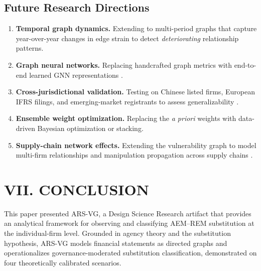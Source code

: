 \documentclass[12pt]{article}
\begin{document}
\subsection*{Future Research Directions}

\begin{enumerate}
    \item \textbf{Temporal graph dynamics.}  Extending to multi-period graphs
    that capture year-over-year changes in edge strain to detect
    \emph{deteriorating} relationship patterns.

    \item \textbf{Graph neural networks.}  Replacing handcrafted graph metrics
    with end-to-end learned GNN representations
    \citep{liu2020,wang2019}.

    \item \textbf{Cross-jurisdictional validation.}  Testing on Chinese listed
    firms, European IFRS filings, and emerging-market registrants to assess
    generalizability \citep{ho2015}.

    \item \textbf{Ensemble weight optimization.}  Replacing the \textit{a
    priori} weights with data-driven Bayesian optimization or stacking.

    \item \textbf{Supply-chain network effects.}  Extending the vulnerability
    graph to model multi-firm relationships and manipulation propagation across
    supply chains \citep{savage2014}.
\end{enumerate}

\section*{\centering VII. CONCLUSION}
\label{sec:conclude}

This paper presented ARS-VG, a Design Science Research artifact that
provides an analytical framework for observing and classifying
AEM--REM substitution at the individual-firm level.  Grounded in
agency theory and the substitution hypothesis, ARS-VG models financial
statements as directed graphs and operationalizes governance-moderated
substitution classification, demonstrated on four theoretically
calibrated scenarios.
\end{document}
